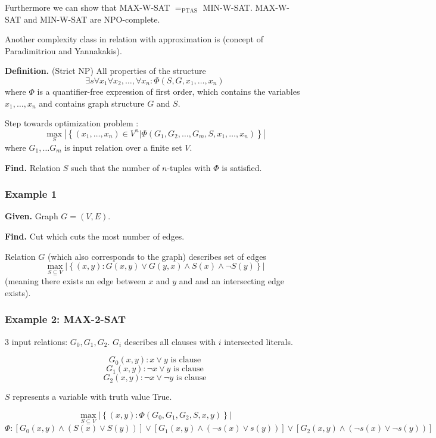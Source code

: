 \documentclass[a4paper]{article}
\newcommand{\given}[1]{\textbf{Given.} #1\par}
\newcommand{\find}[1]{\textbf{Find.} #1\par}
\newcommand{\cls}[1]{\rm{#1}}
\newcommand{\probl}[1]{\text{\textsc{#1}}}
\newcommand{\set}[1]{\left\{#1\right\}}
\newenvironment{spec}[0]{\begin{framed}}{\end{framed}}
\begin{document}
Furthermore we can show that MAX-W-SAT $=_{\text{PTAS}}$ MIN-W-SAT.
MAX-W-SAT and MIN-W-SAT are \cls{NP}O-complete.

Another complexity class in relation with approximation is \probl{MaxSNP}
(concept of Paradimitriou and Yannakakis).

\textbf{Definition.} (Strict \cls{NP})
  All properties of the structure
  \[
    \exists s \forall x_1 \forall x_2, \ldots, \forall x_n:
    \Phi(S, G, x_1, \ldots, x_n)
  \]
  where $\Phi$ is a quantifier-free expression of first order, which contains
  the variables $x_1, \ldots, x_n$ and contains graph structure $G$ and $S$.

Step towards optimization problem \probl{MaxSNP}:
\[
  \max_S \left|
    \set{(x_1, \ldots, x_n) \in V^n | \Phi(G_1, G_2, \ldots, G_m, S, x_1, \ldots, x_n)}
  \right|
\]
where $G_1, \ldots G_m$ is input relation over a finite set $V$.

\textbf{Find.} Relation $S$ such that the number of $n$-tuples
  with $\Phi$ is satisfied.

\subsubsection{Example 1}
%
\begin{spec}
  \given{Graph $G = (V, E)$.}
  \find{Cut which cuts the most number of edges.}
\end{spec}

Relation $G$ (which also corresponds to the graph) describes set of edges
\[
  \max_{S \subseteq V} \left|
    \set{(x, y) : G(x, y) \lor G(y, x) \land S(x) \land \neg S(y)}
  \right|
\]
(meaning there exists an edge between $x$ and $y$ and
and an intersecting edge exists).

\subsubsection{Example 2: MAX-2-SAT}
%
3 input relations: $G_0, G_1, G_2$.
$G_i$ describes all clauses with $i$ intersected literals.

\[
  G_0(x, y) : x \lor y \text{ is clause}
\] \[
  G_1(x, y) : \neg x \lor y \text{ is clause}
\] \[
  G_2(x, y) : \neg x \lor \neg y \text{ is clause}
\]

$S$ represents a variable with truth value True.

\[
  \max_{S \subseteq V} \left|
    \set{(x, y): \Phi(G_0, G_1, G_2, S, x, y)}
  \right|
\] \[
  \Phi: [G_0(x, y) \land (S(x) \lor S(y))] \lor
        [G_1(x, y) \land (\neg s(x) \lor s(y))] \lor
        [G_2(x, y) \land (\neg s(x) \lor \neg s(y))]
\]
\end{document}
